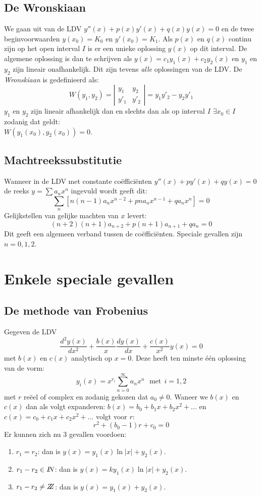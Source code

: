 \documentclass[twoside]{report}
\begin{document}
\subsection{De Wronskiaan}
We gaan uit van de LDV $y''(x)+p(x)y'(x)+q(x)y(x)=0$ en de twee beginvoorwaarden
$y(x_0)=K_0$ en $y'(x_0)=K_1$. Als $p(x)$ en $q(x)$ continu zijn op het open
interval $I$ is er een unieke oplossing $y(x)$ op dit interval.
\npar
De algemene oplossing is dan te schrijven als $y(x)=c_1y_1(x)+c_2y_2(x)$ en
$y_1$ en $y_2$ zijn lineair onafhankelijk. Dit zijn tevens {\it alle}
oplossingen van de LDV.
\npar
De {\it Wronskiaan} is gedefinieerd als:
\[
W(y_1,y_2)=
\left|\begin{array}{cc}
y_1&y_2\\
y'_1&y'_2
\end{array}\right|=y_1y'_2-y_2y'_1
\]
$y_1$ en $y_2$ zijn lineair afhankelijk dan en slechts dan als op interval
$I$ $\exists x_0\in I$ zodanig dat geldt:\\
$W(y_1(x_0),y_2(x_0))=0$.

\subsection{Machtreekssubstitutie}
Wanneer in de LDV met constante co\"effici\"enten $y''(x)+py'(x)+qy(x)=0$ de
reeks $y=\sum a_nx^n$ ingevuld wordt geeft dit:
\[
\sum_n\left[n(n-1)a_nx^{n-2}+pna_nx^{n-1}+qa_nx^n\right]=0
\]
Gelijkstellen van gelijke machten van $x$ levert:
\[
(n+2)(n+1)a_{n+2}+p(n+1)a_{n+1}+qa_n=0
\]
Dit geeft een algemeen verband tussen de co\"effici\"enten. Speciale gevallen
zijn $n=0,1,2$.

\section{Enkele speciale gevallen}
\subsection{De methode van Frobenius}
Gegeven de LDV
\[
\frac{d^2y(x)}{dx^2}+\frac{b(x)}{x}\frac{dy(x)}{dx}+\frac{c(x)}{x^2}y(x)=0
\]
met $b(x)$ en $c(x)$ analytisch op $x=0$. Deze heeft ten minste \'e\'en
oplossing van de vorm:
\[
y_i(x)=x^{r_i}\sum_{n=0}^\infty a_nx^n~~~\mbox{met}~~i=1,2
\]
met $r$ re\"eel of complex en zodanig gekozen dat $a_0\neq0$. Waneer we $b(x)$
en $c(x)$ dan als volgt expanderen: $b(x)=b_0+b_1x+b_2x^2+...$ en
$c(x)=c_0+c_1x+c_2x^2+...$ volgt voor $r$:
\[
r^2+(b_0-1)r+c_0=0
\]
Er kunnen zich nu 3 gevallen voordoen:
\begin{enumerate}
\item $r_1=r_2$: dan is $y(x)=y_1(x)\ln|x|+y_2(x)$.
\item $r_1-r_2\in I\hspace{-1mm}N$: dan is $y(x)=ky_1(x)\ln|x|+y_2(x)$.
\item $r_1-r_2\neq Z\hspace{-1ex}Z$: dan is $y(x)=y_1(x)+y_2(x)$.
\end{enumerate}
\end{document}
